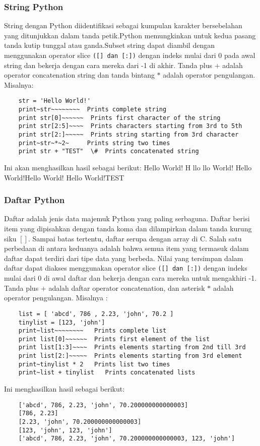 \subsubsection{String Python}
String dengan Python diidentifikasi sebagai kumpulan karakter bersebelahan yang ditunjukkan dalam tanda petik.Python memungkinkan untuk kedua pasang tanda kutip tunggal atau ganda.Subset string dapat diambil dengan menggunakan operator slice \verb|([] dan [:])| dengan indeks mulai dari 0 pada awal string dan bekerja dengan cara mereka dari -1 di akhir. 
Tanda plus \(+\) adalah operator concatenation string dan tanda bintang \(*\) adalah operator pengulangan.
Misalnya:
\begin{verbatim}
	str = 'Hello World!' 
	print~str~~~~~~~~  Prints complete string 
	print str[0]~~~~~~  Prints first character of the string 
	print str[2:5]~~~~  Prints characters starting from 3rd to 5th
	print str[2:]~~~~~  Prints string starting from 3rd character 
	print~str~*~2~     Prints string two times 
	print str + "TEST"  \#  Prints concatenated string 
\end{verbatim}
Ini akan menghasilkan hasil sebagai berikut:
	Hello World! 
	H  
	llo 
	llo World!
	Hello World!Hello World! 
	Hello World!TEST

\subsubsection{Daftar Python}
	Daftar adalah jenis data majemuk Python yang paling serbaguna. Daftar berisi item yang dipisahkan dengan tanda koma dan dilampirkan dalam tanda kurung siku \([]\). Sampai batas tertentu, daftar serupa dengan array di C. Salah satu perbedaan di antara keduanya adalah bahwa semua item yang termasuk dalam daftar dapat terdiri dari tipe data yang berbeda.
Nilai yang tersimpan dalam daftar dapat diakses menggunakan operator slice \verb|([] dan [:])| dengan indeks mulai dari 0 di awal daftar dan bekerja dengan cara mereka untuk mengakhiri -1. Tanda plus \(+\) adalah daftar operator concatenation, dan asterisk \(*\) adalah operator pengulangan.
Misalnya :
\begin{verbatim}
	list = [ 'abcd', 786 , 2.23, 'john', 70.2 ] 
	tinylist = [123, 'john'] 
	print~list~~~~~~~~   Prints complete list 
	print list[0]~~~~~~  Prints first element of the list 
	print list[1:3]~~~~  Prints elements starting from 2nd till 3rd  
	print list[2:]~~~~~  Prints elements starting from 3rd element 
	print~tinylist * 2   Prints list two times
	print~list + tinylist   Prints concatenated lists
\end{verbatim}
Ini menghasilkan hasil sebagai berikut:
\begin{verbatim}
	['abcd', 786, 2.23, 'john', 70.200000000000003] 
	[786, 2.23] 
	[2.23, 'john', 70.200000000000003] 
	[123, 'john', 123, 'john'] 
	['abcd', 786, 2.23, 'john', 70.200000000000003, 123, 'john'] 
\end{verbatim}
